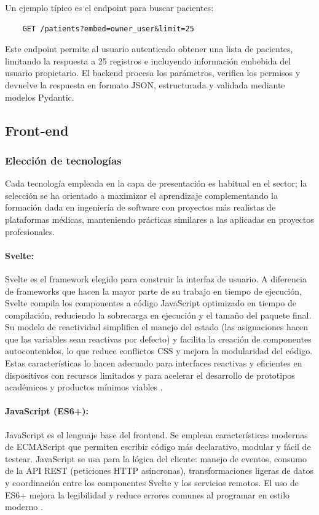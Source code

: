 \documentclass[12pt, a4paper]{article}
\begin{document}
Un ejemplo típico es el endpoint para buscar pacientes:

\begin{verbatim}
	GET /patients?embed=owner_user&limit=25
\end{verbatim}

Este endpoint permite al usuario autenticado obtener una lista de pacientes, limitando la respuesta a 25 registros e incluyendo información embebida del usuario propietario. El backend procesa los parámetros, verifica los permisos y devuelve la respuesta en formato JSON, estructurada y validada mediante modelos Pydantic.



\subsection{Front‑end}

\subsubsection{Elección de tecnologías}

Cada tecnología empleada en la capa de presentación es habitual en el sector; la selección se ha orientado a maximizar el aprendizaje complementando la formación dada en ingeniería de software con proyectos más realistas de plataformas médicas, manteniendo prácticas similares a las aplicadas en proyectos profesionales.

\paragraph{Svelte:}
Svelte es el framework elegido para construir la interfaz de usuario. A diferencia de frameworks que hacen la mayor parte de su trabajo en tiempo de ejecución, Svelte compila los componentes a código JavaScript optimizado en tiempo de compilación, reduciendo la sobrecarga en ejecución y el tamaño del paquete final. Su modelo de reactividad simplifica el manejo del estado (las asignaciones hacen que las variables sean reactivas por defecto) y facilita la creación de componentes autocontenidos, lo que reduce conflictos CSS y mejora la modularidad del código. Estas características lo hacen adecuado para interfaces reactivas y eficientes en dispositivos con recursos limitados y para acelerar el desarrollo de prototipos académicos y productos mínimos viables \cite{Svelte}.

\paragraph{JavaScript (ES6+):}
JavaScript es el lenguaje base del frontend. Se emplean características modernas de ECMAScript que permiten escribir código más declarativo, modular y fácil de testear. JavaScript se usa para la lógica del cliente: manejo de eventos, consumo de la API REST (peticiones HTTP asíncronas), transformaciones ligeras de datos y coordinación entre los componentes Svelte y los servicios remotos. El uso de ES6+ mejora la legibilidad y reduce errores comunes al programar en estilo moderno \cite{JSMDN}.
\end{document}

